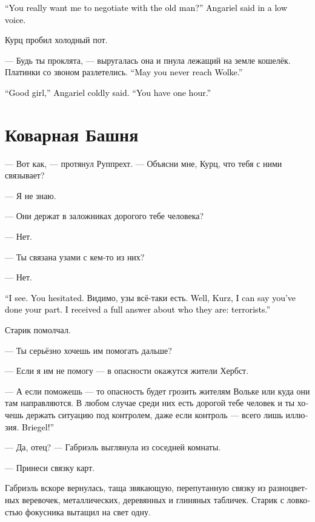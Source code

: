 \documentclass[a4paper,12pt,fleqn]{book}\usepackage{cooltooltips}\usepackage{polyglossia}\setdefaultlanguage[babelshorthands=true]{russian}\setotherlanguage{english}\defaultfontfeatures{Ligatures=TeX,Mapping=tex-text} \usepackage{xcolor}\definecolor{lightgray}{HTML}{bbbbbb}\color{lightgray}\newcommand{\ml}[3]{\textenglish{\textcolor{black}{#3}}}
\begin{document}
\ml{$0$}
{--- Ты серьёзно хочешь, чтобы со стариком пошла говорить я? --- Ангарьель понизила голос.}
{``You really want me to negotiate with the old man?'' Angariel said in a low voice.}

Курц пробил холодный пот.

--- Будь ты проклята, --- выругалась она и пнула лежащий на земле кошелёк.
Платинки со звоном разлетелись.
\ml{$0$}
{--- Надеюсь, ты не достигнешь Вольке.}
{``May you never reach Wolke.''}

\ml{$0$}
{--- Вот и молодец, --- холодно сказала Ангарьель.}
{``Good girl,'' Angariel coldly said.}
\ml{$0$}
{--- Даю час.}
{``You have one hour.''}

\section{Коварная Башня}

--- Вот как, --- протянул Руппрехт.
--- Объясни мне, Курц, что тебя с ними связывает?

--- Я не знаю.

--- Они держат в заложниках дорогого тебе человека?

--- Нет.

--- Ты связана узами с кем-то из них?

--- Нет.

\ml{$0$}
{--- Понятно.}
{``I see.}
\ml{$0$}
{Ты заколебалась.}
{You hesitated.}
Видимо, узы всё-таки есть.
\ml{$0$}
{Ну что ж, Курц, можно сказать, что уговор ты выполнила.}
{Well, Kurz, I can say you've done your part.}
\ml{$0$}
{Я получил исчерпывающий ответ, кто они есть --- террористы.}
{I received a full answer about who they are: terrorists.''}

Старик помолчал.

--- Ты серьёзно хочешь им помогать дальше?

--- Если я им не помогу --- в опасности окажутся жители Хербст.

--- А если поможешь --- то опасность будет грозить жителям Вольке или куда они там направляются.
В любом случае среди них есть дорогой тебе человек и ты хочешь держать ситуацию под контролем, даже если контроль --- всего лишь иллюзия.
\ml{$0$}
{Бригель!}
{Briegel!''}

--- Да, отец? --- Габриэль выглянула из соседней комнаты.

--- Принеси связку карт.

Габриэль вскоре вернулась, таща звякающую, перепутанную связку из разноцветных веревочек, металлических, деревянных и глиняных табличек.
Старик с ловкостью фокусника вытащил на свет одну.
\end{document}
